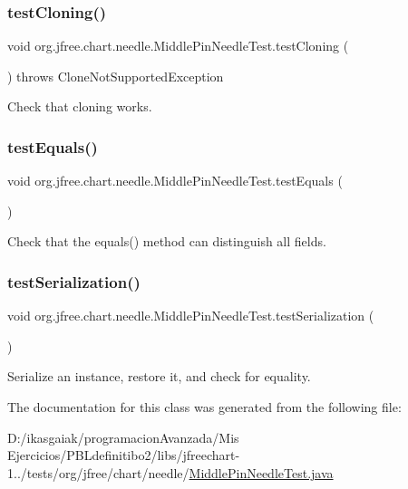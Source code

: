 \subsubsection{\texorpdfstring{test\+Cloning()}{testCloning()}}
{\footnotesize\ttfamily void org.\+jfree.\+chart.\+needle.\+Middle\+Pin\+Needle\+Test.\+test\+Cloning (\begin{DoxyParamCaption}{ }\end{DoxyParamCaption}) throws Clone\+Not\+Supported\+Exception}

Check that cloning works. \mbox{\label{classorg_1_1jfree_1_1chart_1_1needle_1_1_middle_pin_needle_test_ae74cf19ef9be37f8279b42fd8a0ade08}} 
\subsubsection{\texorpdfstring{test\+Equals()}{testEquals()}}
{\footnotesize\ttfamily void org.\+jfree.\+chart.\+needle.\+Middle\+Pin\+Needle\+Test.\+test\+Equals (\begin{DoxyParamCaption}{ }\end{DoxyParamCaption})}

Check that the equals() method can distinguish all fields. \mbox{\label{classorg_1_1jfree_1_1chart_1_1needle_1_1_middle_pin_needle_test_a8c8a993297b9009765a0da49df9b078c}} 
\subsubsection{\texorpdfstring{test\+Serialization()}{testSerialization()}}
{\footnotesize\ttfamily void org.\+jfree.\+chart.\+needle.\+Middle\+Pin\+Needle\+Test.\+test\+Serialization (\begin{DoxyParamCaption}{ }\end{DoxyParamCaption})}

Serialize an instance, restore it, and check for equality. 

The documentation for this class was generated from the following file\+:\begin{DoxyCompactItemize}
\item 
D\+:/ikasgaiak/programacion\+Avanzada/\+Mis Ejercicios/\+P\+B\+Ldefinitibo2/libs/jfreechart-\/1../tests/org/jfree/chart/needle/\mbox{\hyperlink{_middle_pin_needle_test_8java}{Middle\+Pin\+Needle\+Test.\+java}}\end{DoxyCompactItemize}
